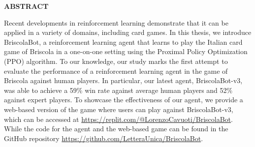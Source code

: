 \begin{center}
    \bf ABSTRACT
\end{center}
Recent developments in reinforcement learning demonstrate that it can be applied in a variety of domains, including card games. In this thesis, we introduce BriscolaBot, a reinforcement learning agent that learns to play the Italian card game of Briscola in a one-on-one setting using the Proximal Policy Optimization (PPO) algorithm. To our knowledge, our study marks the first attempt to evaluate the performance of a reinforcement learning agent in the game of Briscola against human players. In particular, our latest agent, BriscolaBot-v3, was able to achieve a 59\% win rate against average human players and 52\% against expert players. To showcase the effectiveness of our agent, we provide a web-based version of the game where users can play against BriscolaBot-v3, which can be accessed at \url{https://replit.com/@LorenzoCavuoti/BriscolaBot}. While the code for the agent and the web-based game can be found in the GitHub repository \url{https://github.com/LetteraUnica/BriscolaBot}.